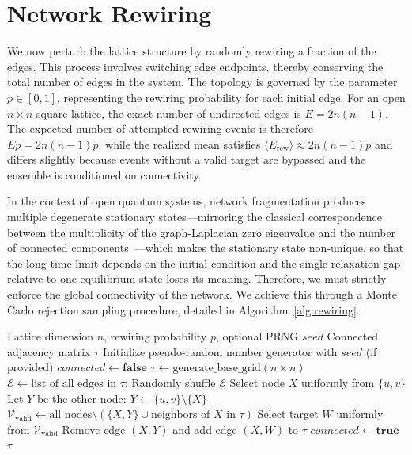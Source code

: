 \documentclass[pdflatex,sn-mathphys-num]{sn-jnl}
\renewcommand{\textcolor}[2]{#2}
\begin{document}
\textcolor{green}{\section{Network Rewiring}}
We now perturb the lattice structure by randomly rewiring a fraction of the edges. This process involves switching edge endpoints, thereby conserving the total number of edges in the system. The topology is governed by the parameter $p \in [0, 1]$, representing the rewiring probability for each initial edge. For an open $n \times n$ square lattice, the exact number of undirected edges is $E = 2n(n-1)$. The expected number of attempted rewiring events is therefore $Ep=2n(n-1)p$, while the realized mean satisfies $\langle E_{\mathrm{rew}} \rangle \approx 2n(n-1)p$ and differs slightly because events without a valid target are bypassed and the ensemble is conditioned on connectivity.

In the context of open quantum systems, network fragmentation produces multiple degenerate stationary states---mirroring the classical correspondence between the multiplicity of the graph-Laplacian zero eigenvalue and the number of connected components~\cite{fiedler1973}---which makes the stationary state non-unique, so that the long-time limit depends on the initial condition and the single relaxation gap relative to one equilibrium state loses its meaning. Therefore, we must strictly enforce the global connectivity of the network. We achieve this through a Monte Carlo rejection sampling procedure, detailed in Algorithm~\ref{alg:rewiring}.

\begin{algorithm}[H]
\caption{Connectivity-Guaranteed Edge Rewiring}
\label{alg:rewiring}
\begin{algorithmic}[1]
\Require Lattice dimension $n$, rewiring probability $p$, optional PRNG $seed$
\Ensure Connected adjacency matrix $\tau$
\State Initialize pseudo-random number generator with $seed$ (if provided)
\State $connected \gets \mathbf{false}$
    \State $\tau \gets \text{generate\_base\_grid}(n \times n)$
    \State $\mathcal{E} \gets \text{list of all edges in } \tau$; Randomly shuffle $\mathcal{E}$
            \State Select node $X$ uniformly from $\{u, v\}$
            \State Let $Y$ be the other node: $Y \gets \{u, v\} \setminus \{X\}$
            \State $\mathcal{V}_{\text{valid}} \gets \text{all nodes} \setminus (\{X, Y\} \cup \text{neighbors of } X \text{ in } \tau)$
                \State Select target $W$ uniformly from $\mathcal{V}_{\text{valid}}$
                \State Remove edge $(X, Y)$ and add edge $(X, W)$ to $\tau$
            \EndIf
        \EndIf
    \EndFor
        \State $connected \gets \mathbf{true}$
    \EndIf
\EndWhile
\State \Return $\tau$
\end{algorithmic}
\end{algorithm}
\end{document}
